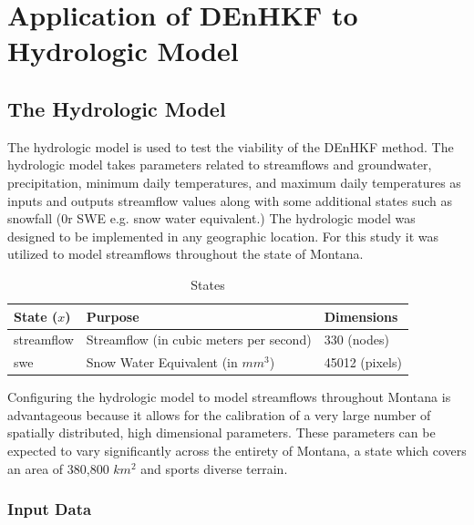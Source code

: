 \chapter{Application of DEnHKF to Hydrologic Model}

\section{The Hydrologic Model}

The hydrologic model is used to test the viability of the DEnHKF method. The hydrologic model takes parameters related to streamflows and groundwater, precipitation, minimum daily temperatures, and maximum daily temperatures as inputs and outputs streamflow values along with some additional states such as snowfall (0r SWE e.g. snow water equivalent.) The hydrologic model was designed to be implemented in any geographic location. For this study it was utilized to model streamflows throughout the state of Montana.

\begin{table}[]
\caption{States} 
\begin{tabular}{lll}
State ($x$) & Purpose                              & Dimensions  \\ \hline
streamflow  & Streamflow (in cubic meters per second)               & 330 (nodes) \\
swe         & Snow Water Equivalent  (in $mm^{3}$) & 45012 (pixels)
\end{tabular}
\label{tab:states}
\end{table}

Configuring the hydrologic model to model streamflows throughout Montana is advantageous because it allows for the calibration of a very large number of spatially distributed, high dimensional parameters. These parameters can be expected to vary significantly across the entirety of Montana, a state which covers an area of 380,800 $km^{2}$ and sports diverse terrain.

\subsection{Input Data}

